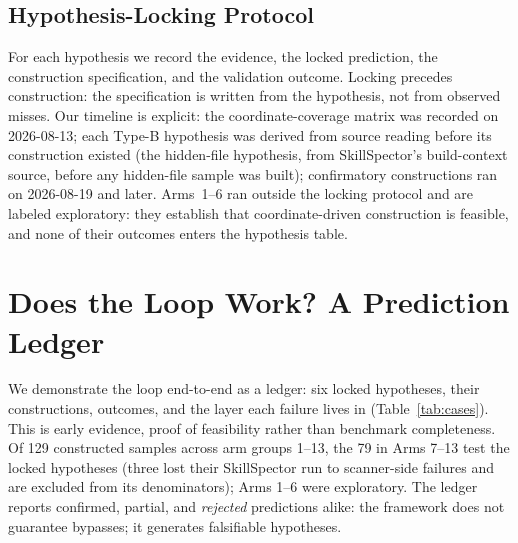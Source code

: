 \documentclass[sigconf,nonacm]{acmart}
\begin{document}
\subsection{Hypothesis-Locking Protocol}
For each hypothesis we record the evidence, the locked prediction, the construction specification, and the validation outcome. Locking precedes construction: the specification is written from the hypothesis, not from observed misses. Our timeline is explicit: the coordinate-coverage matrix was recorded on 2026-08-13; each Type-B hypothesis was derived from source reading before its construction existed (the hidden-file hypothesis, from SkillSpector's build-context source, before any hidden-file sample was built); confirmatory constructions ran on 2026-08-19 and later. Arms~1--6 ran outside the locking protocol and are labeled exploratory: they establish that coordinate-driven construction is feasible, and none of their outcomes enters the hypothesis table.

\section{Does the Loop Work? A Prediction Ledger}
\label{sec:validate}

We demonstrate the loop end-to-end as a ledger: six locked hypotheses, their constructions, outcomes, and the layer each failure lives in (Table~\ref{tab:cases}). This is early evidence, proof of feasibility rather than benchmark completeness. Of 129 constructed samples across arm groups 1--13, the 79 in Arms 7--13 test the locked hypotheses (three lost their SkillSpector run to scanner-side failures and are excluded from its denominators); Arms 1--6 were exploratory. The ledger reports confirmed, partial, and \emph{rejected} predictions alike: the framework does not guarantee bypasses; it generates falsifiable hypotheses.
\end{document}

